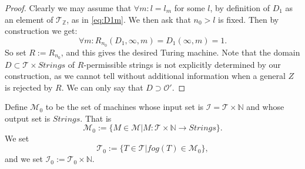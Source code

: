 \documentclass{amsart}  %
\numberwithin{equation}{section}
\newtheorem{definition}[equation]{Definition}
\theoremstyle{definition}
\theoremstyle{remark}
\begin{document}
{\begin{proof}
Clearly we may assume that $ \forall m: l=l _{m}   $ for some $l$, by definition of $D _{1} $ as an element of $\mathcal{T} _{\mathbb{Z}} $, as in \eqref{eq:D1m}.
   We  then ask that $n _{0}  > l$ is fixed. Then by construction we get: $$\forall m: R _{n _{0} } (D_1 , \infty,m)= D_1 (\infty,m)=1.  $$  So set $R:= R _{n _{0} }$, and this gives the desired Turing machine. Note that the domain $D \subset \mathcal{T} \times Strings$ of $R$-permissible strings is not explicitly determined by our construction, as we cannot tell without additional information when a general $Z$ is rejected by $R$. We can only say that $D \supset \mathcal{O}'$. 
\end{proof}
Define $\mathcal{M} _{0} $ to be the set of machines whose input set is $\mathcal{I}= \mathcal{T}  \times \mathbb{N}$ and whose output set is $Strings $. That is $$\mathcal{M} _{0} := \{M \in \mathcal{M}| M: \mathcal{T} \times \mathbb{N}  \to Strings \}.
$$ 
We set $$\mathcal{T} _{0}:= \{T \in \mathcal{T}| fog (T) \in \mathcal{M} _{0} \},
$$ and we set $\mathcal{I} _{0} := \mathcal{T} _{0} \times \mathbb{N}  $.  %
}
\end{document}
